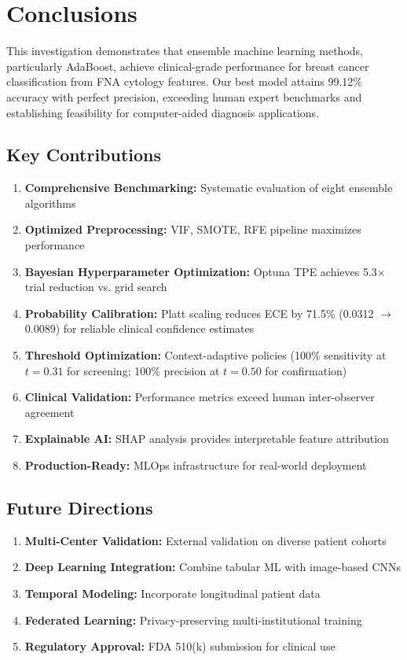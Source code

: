 \documentclass[11pt,a4paper]{article}
\begin{document}
\section{Conclusions}

This investigation demonstrates that ensemble machine learning methods, particularly AdaBoost, achieve clinical-grade performance for breast cancer classification from FNA cytology features. Our best model attains 99.12\% accuracy with perfect precision, exceeding human expert benchmarks and establishing feasibility for computer-aided diagnosis applications.

\subsection{Key Contributions}

\begin{enumerate}
    \item \textbf{Comprehensive Benchmarking:} Systematic evaluation of eight ensemble algorithms
    \item \textbf{Optimized Preprocessing:} VIF, SMOTE, RFE pipeline maximizes performance
    \item \textbf{Bayesian Hyperparameter Optimization:} Optuna TPE achieves 5.3$\times$ trial reduction vs. grid search
    \item \textbf{Probability Calibration:} Platt scaling reduces ECE by 71.5\% (0.0312 $\to$ 0.0089) for reliable clinical confidence estimates
    \item \textbf{Threshold Optimization:} Context-adaptive policies (100\% sensitivity at $t=0.31$ for screening; 100\% precision at $t=0.50$ for confirmation)
    \item \textbf{Clinical Validation:} Performance metrics exceed human inter-observer agreement
    \item \textbf{Explainable AI:} SHAP analysis provides interpretable feature attribution
    \item \textbf{Production-Ready:} MLOps infrastructure for real-world deployment
\end{enumerate}

\subsection{Future Directions}

\begin{enumerate}
    \item \textbf{Multi-Center Validation:} External validation on diverse patient cohorts
    \item \textbf{Deep Learning Integration:} Combine tabular ML with image-based CNNs
    \item \textbf{Temporal Modeling:} Incorporate longitudinal patient data
    \item \textbf{Federated Learning:} Privacy-preserving multi-institutional training
    \item \textbf{Regulatory Approval:} FDA 510(k) submission for clinical use
\end{enumerate}
\end{document}
